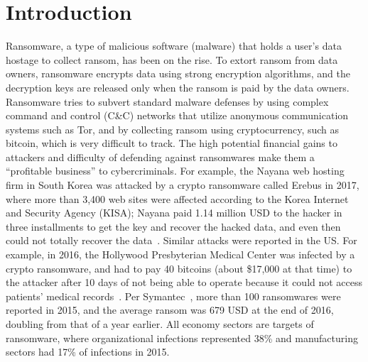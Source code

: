 \documentclass[conference]{IEEEtran}
\begin{document}




%


\section{Introduction}

Ransomware, a type of malicious software (malware) that holds a user's data hostage to
collect ransom, has been on the rise.  To extort ransom from data owners, ransomware encrypts data
using strong encryption algorithms, and the decryption keys are
released only when the ransom is paid by the data owners.  Ransomware tries to subvert standard malware defenses by using  complex command and control (C\&C) networks that utilize anonymous communication systems such as Tor, and by collecting ransom using cryptocurrency, such
as bitcoin, which is very difficult to track.
The high potential financial gains to attackers and difficulty of defending against ransomwares make them  a ``profitable business'' to cybercriminals.  For example, the Nayana web hosting firm in South Korea was attacked by a crypto ransomware called Erebus in
2017, where more than 3,400 web
sites were affected according to the Korea Internet and Security
Agency (KISA); Nayana paid 1.14 million USD to the hacker in three
installments to get the key and recover the hacked data, and even then could not totally recover the data~\cite{zdnet}.  Similar attacks were reported in the US. For example, in 2016, the Hollywood Presbyterian Medical Center was
infected by a crypto ransomware, and had to pay 40 bitcoins (about
\$17,000 at that time) to the attacker after 10 days of not being able to
operate because it could not access patients’ medical
records~\cite{everette16}.  Per Symantec~\cite{symantec16}, more than 100 ransomwares were reported in 2015, and the average ransom was 679 USD at the end of
2016, doubling from that of a year earlier.  All economy sectors are targets of ransomware, where organizational infections represented  38\% and manufacturing
sectors had 17\% of infections in 2015.
\end{document}
